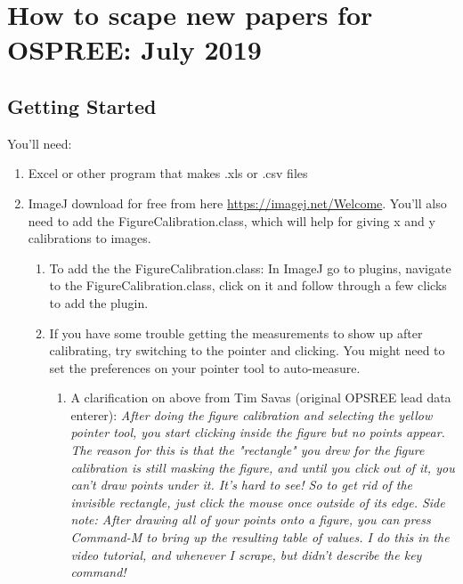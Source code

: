 \documentclass{article}[12pt]
\begin{document}
\section*{How to scape new papers for OSPREE: July 2019}
\subsection*{Getting Started}
You'll need:
\begin{enumerate}
\item Excel or other program that makes .xls  or .csv files
\item ImageJ download for free from here \url{https://imagej.net/Welcome}. You'll also need to add the Figure\textunderscore Calibration.class, which will help for giving x and y calibrations to images. 
\begin{enumerate}
\item To add the the Figure\textunderscore Calibration.class: In ImageJ go to plugins, navigate to the Figure\textunderscore Calibration.class, click on it and follow through a few clicks to add the plugin.
\item If you have some trouble getting the measurements to show up after calibrating, try switching to the pointer and clicking. You might need to set the preferences on your pointer tool to auto-measure.
\begin{enumerate}
\item A clarification on above from Tim Savas (original OPSREE lead data enterer): \textit{After doing the figure calibration and selecting the yellow pointer tool, you start clicking inside the figure but no points appear. The reason for this is that the "rectangle" you drew for the figure calibration is still masking the figure, and until you click out of it, you can't draw points under it. It's hard to see! So to get rid of the invisible rectangle, just click the mouse once outside of its edge. Side note: After drawing all of your points onto a figure, you can press Command-M to bring up the resulting table of values. I do this in the video tutorial, and whenever I scrape, but didn't describe the key command!}
\end{enumerate}
\end{enumerate}
\end{enumerate}
\end{document}
